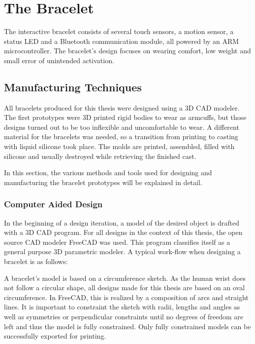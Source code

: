 \chapter{The Bracelet}
\label{chap:bracelet}
The interactive bracelet consists of several touch sensors, a motion sensor, a status \ac{LED} and a Bluetooth communication module, all powered by an ARM microcontroller. The bracelet's design focuses on wearing comfort, low weight and small error of unintended activation.

\section{Manufacturing Techniques}

All bracelets produced for this thesis were designed using a 3D \ac{CAD} modeler. The first prototypes were 3D printed rigid bodies to wear as armcuffs, but those designs turned out to be too inflexible and uncomfortable to wear. A different material for the bracelets was needed, so a transition from printing to casting with liquid silicone took place. The molds are printed, assembled, filled with silicone and usually destroyed while retrieving the finished cast.

In this section, the various methods and tools used for designing and manufacturing the bracelet prototypes will be explained in detail.

\subsection{Computer Aided Design}
In the beginning of a design iteration, a model of the desired object is drafted with a 3D \ac{CAD} program. For all designs in the context of this thesis, the open source \ac{CAD} modeler FreeCAD\cite{freecad} was used. This program classifies itself as a general purpose 3D parametric modeler. A typical work-flow when designing a bracelet is as follows:

A bracelet's model is based on a circumference sketch. As the human wrist does not follow a circular shape, all designs made for this thesis are based on an oval circumference. In FreeCAD, this is realized by a composition of arcs and straight lines. It is important to constraint the sketch with radii, lengths and angles as well as symmetries or perpendicular constraints until no degrees of freedom are left and thus the model is fully constrained. Only fully constrained models can be successfully exported for printing.

